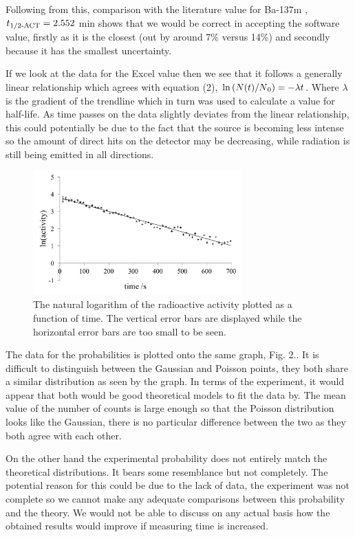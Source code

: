 \documentclass[twocolumn]{revtex4}
\newcommand{\squeezeup}{\vspace{-2.5mm}}
\begin{document}
Following from this, comparison with the literature value for Ba-137m \cite{true}, $t\textsubscript{1/2-ACT} = 2.552$ min shows that we would be correct in accepting the software value, firstly as it is the closest (out by around 7\% versus 14\%) and secondly because it has the smallest uncertainty. 

If we look at the data for the Excel value then we see that it follows a generally linear relationship which agrees with equation (2), $\ln{(N(t)/N\textsubscript{0})}=-\lambda{t}$. Where $\lambda$ is the gradient of the trendline which in turn was used to calculate a value for half-life. As time passes on the data slightly deviates from the linear relationship, this could potentially be due to the fact that the source is becoming less intense so the amount of direct hits on the detector may be decreasing, while radiation is still being emitted in all directions. 

\begin{figure}[!h]
\begin{center}
\includegraphics[width=8cm]{fig1}
\caption[]{The natural logarithm of the radioactive activity plotted as a function of time. The vertical error bars are displayed while the horizontal error bars are too small to be seen.}
\label{fig:fig1}
\end{center}
\end{figure}
\squeezeup

The data for the probabilities is plotted onto the same graph, Fig. 2.. It is difficult to distinguish between the Gaussian and Poisson points, they both share a similar distribution as seen by the graph. In terms of the experiment, it would appear that both would be good theoretical models to fit the data by. The mean value of the number of counts is large enough so that the Poisson distribution looks like the Gaussian, there is no particular difference between the two as they both agree with each other. 

On the other hand the experimental probability does not entirely match the theoretical distributions. It bears some resemblance but not completely. The potential reason for this could be due to the lack of data, the experiment was not complete so we cannot make any adequate comparisons between this probability and the theory. We would not be able to discuss on any actual basis how the obtained results would improve if measuring time is increased. 
\end{document}
